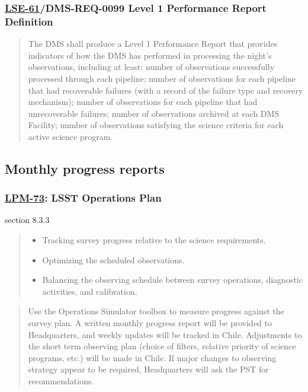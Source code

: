 \subsubsection{\href{https://ls.st/lse-61}{LSE-61}/DMS-REQ-0099 Level 1 Performance Report Definition}
\label{sec:org7263405}
\begin{quote}
The DMS shall produce a Level 1 Performance Report that provides indicators of how the DMS has performed in processing the night's observations, including at least: number of observations successfully processed through each pipeline; number of observations for each pipeline that had recoverable failures (with a record of the failure type and recovery mechanism); number of observations for each pipeline that had unrecoverable failures; number of observations archived at each DMS Facility; number of observations satisfying the science criteria for each active science program.
\end{quote}
\subsection{Monthly progress reports}
\label{sec:org15e06d3}
\subsubsection{\href{https://ls.st/lpm-73}{LPM-73}: LSST Operations Plan}
\label{sec:org49f2727}
section 8.3.3
\begin{quote}
\begin{itemize}
\item Tracking survey progress relative to the science requirements.
\item Optimizing the scheduled observations.
\item Balancing the observing schedule between survey operations, diagnostic activities, and calibration.
\end{itemize}
\end{quote}

\begin{quote}
Use the Operations Simulator toolbox to measure progress against the
survey plan. A written monthly progress report will be provided to
Headquarters, and weekly updates will be tracked in Chile.
Adjustments to the short term observing plan (choice of filters,
relative priority of science programs, etc.)  will be made in Chile.
If major changes to observing strategy appear to be required,
Headquarters will ask the PST for recommendations.
\end{quote}
